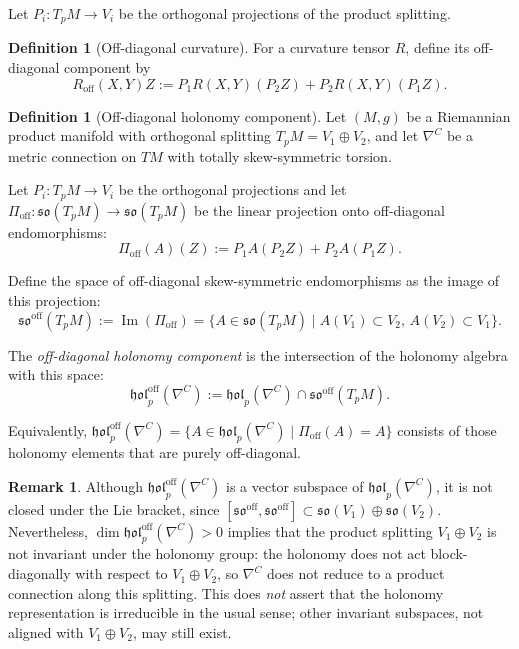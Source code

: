 \documentclass[11pt,reqno]{amsart}
\theoremstyle{plain}
\theoremstyle{definition}
\newtheorem{definition}[theorem]{Definition}
\newtheorem{remark}[theorem]{Remark}
\numberwithin{equation}{section}
\begin{document}
Let \(P_i:T_pM\to V_i\) be the orthogonal projections of the product splitting.

\begin{definition}[Off-diagonal curvature]\label{def:off-R}
For a curvature tensor \(R\), define its off-diagonal component by
\begin{equation}
R_{\mathrm{off}}(X,Y)Z := P_1 R(X,Y)(P_2 Z) + P_2 R(X,Y)(P_1 Z).
\end{equation}
\end{definition}

\begin{definition}[Off-diagonal holonomy component] \label{def:off-hol}
Let $(M,g)$ be a Riemannian product manifold with orthogonal splitting $T_pM = V_1 \oplus V_2$, and let $\nabla^C$ be a metric connection on $TM$ with totally skew-symmetric torsion. 

Let $P_i : T_pM \to V_i$ be the orthogonal projections and let $\Pi_{\mathrm{off}} : \mathfrak{so}(T_pM) \to \mathfrak{so}(T_pM)$ be the linear projection onto off-diagonal endomorphisms:
\[
\Pi_{\mathrm{off}}(A)(Z) := P_1 A(P_2 Z) + P_2 A(P_1 Z).
\]

Define the space of off-diagonal skew-symmetric endomorphisms as the image of this projection:
\[
\mathfrak{so}^{\mathrm{off}}(T_pM) := \operatorname{Im}(\Pi_{\mathrm{off}}) = \{ A \in \mathfrak{so}(T_pM) \mid A(V_1) \subset V_2, \, A(V_2) \subset V_1 \}.
\]

The \emph{off-diagonal holonomy component} is the intersection of the holonomy algebra with this space:
\[
\mathfrak{hol}_p^{\mathrm{off}}(\nabla^C) := \mathfrak{hol}_p(\nabla^C) \cap \mathfrak{so}^{\mathrm{off}}(T_pM).
\]

Equivalently, $\mathfrak{hol}_p^{\mathrm{off}}(\nabla^C) = \{ A \in \mathfrak{hol}_p(\nabla^C) \mid \Pi_{\mathrm{off}}(A) = A \}$ consists of those holonomy elements that are purely off-diagonal.
\end{definition}

\begin{remark}
Although $\mathfrak{hol}_p^{\mathrm{off}}(\nabla^C)$ is a vector subspace of $\mathfrak{hol}_p(\nabla^C)$, it is not closed under the Lie bracket, since $[\mathfrak{so}^{\mathrm{off}}, \mathfrak{so}^{\mathrm{off}}] \subset \mathfrak{so}(V_1) \oplus \mathfrak{so}(V_2)$. Nevertheless, $\dim \mathfrak{hol}_p^{\mathrm{off}}(\nabla^C) > 0$ implies that the product splitting $V_1 \oplus V_2$ is not invariant under the holonomy group: the holonomy does not act block-diagonally with respect to $V_1\oplus V_2$, so $\nabla^C$ does not reduce to a product connection along this splitting. This does \emph{not} assert that the holonomy representation is irreducible in the usual sense; other invariant subspaces, not aligned with $V_1\oplus V_2$, may still exist.
\end{remark}
\end{document}
